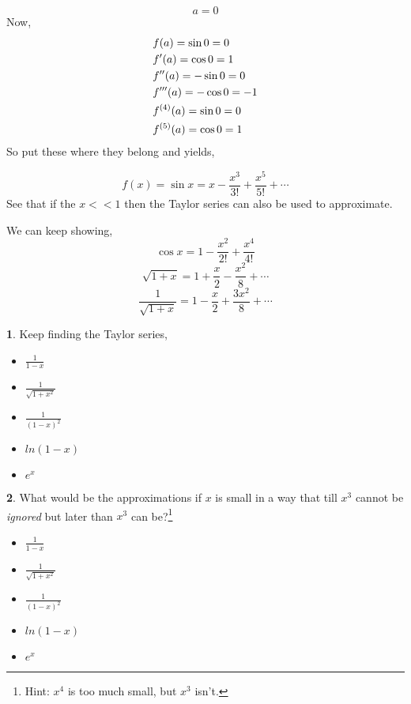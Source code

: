 \documentclass[11pt,a4paper,twocolumn,openright]{article}
\theoremstyle{definition}
\theoremstyle{definition}
\newtheorem{pr}{ \framebox[0.05\textwidth]{{\sffamily Pr}} }
\theoremstyle{definition}
\theoremstyle{definition}
\begin{document}
\[a = 0 \]
Now, \begin{align}
& f(a) = \sin 0 = 0 \notag \\
&f'(a) =  \cos 0 = 1\notag \\
&f''(a) = -\sin 0 = 0 \notag\\
& f'''(a) = -\cos 0 = -1\notag \\
&f^{(4)} (a) = \sin 0 = 0 \notag\\
&f^{(5)} (a) = \cos 0 = 1
\end{align}
So put these where they belong and yields,

\begin{equation}
f(x)= \sin x = x - \frac{x^3}{3!} + \frac{x^5}{5!} + \cdots
\end{equation}
See that if the $x<<1$ then the Taylor series can also be used to approximate.


We can keep showing,
\begin{equation}
\cos x = 1 - \frac{x^2}{2!} + \frac{x^4}{4!}
\end{equation}
\begin{equation}
\sqrt{1 + x} =  1 + \frac{x}{2} - \frac{x^2}{8} + \cdots
\end{equation}
\begin{equation}
\frac{1}{\sqrt{1 + x}} = 1 - \frac{x}{2} + \frac{3x^2}{8} + \cdots
\end{equation}

\begin{pr}
Keep finding the Taylor series,
\begin{itemize}
\item$ \frac{1}{1-x}$
\item$ \frac{1}{\sqrt{1 + x^2}}$
\item$ \frac{1}{(1-x)^2} $
\item$ln(1-x) $
\item$ e^x$
\end{itemize}
\end{pr}
\begin{pr}
What would be the approximations if $x$ is small in a way that till $x^3$ cannot be \emph{ignored} but later than $x^3$ can be?\footnote{Hint: $x^4$ is too much small, but $x^3$ isn't.}
\begin{itemize}
\item$ \frac{1}{1-x}$
\item$ \frac{1}{\sqrt{1 + x^2}}$
\item$ \frac{1}{(1-x)^2} $
\item$ln(1-x) $
\item$ e^x$
\end{itemize}
\end{pr}
\end{document}
